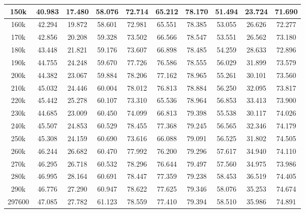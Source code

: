 \documentclass[12pt]{article}
\numberwithin{equation}{section}
\begin{document}
\begin{center}
{\begin{tabular}{|c|c|c|c|c|c|c|c|c|c|}
150k   & 40.983 & 17.480 & 58.076 & 72.714 & 65.212 & 78.170 & 51.494 & 23.724 & 71.690 \\ \hline
160k   & 42.294 & 19.872 & 58.601 & 72.981 & 65.551 & 78.385 & 53.055 & 26.626 & 72.277 \\ \hline
170k   & 42.856 & 20.208 & 59.328 & 73.502 & 66.566 & 78.547 & 53.551 & 26.562 & 73.180 \\ \hline
180k   & 43.448 & 21.821 & 59.176 & 73.607 & 66.898 & 78.485 & 54.259 & 28.633 & 72.896 \\ \hline
190k   & 44.755 & 24.248 & 59.670 & 77.726 & 76.586 & 78.555 & 56.029 & 31.899 & 73.579 \\ \hline
200k   & 44.382 & 23.067 & 59.884 & 78.206 & 77.162 & 78.965 & 55.261 & 30.101 & 73.560 \\ \hline
210k   & 45.032 & 24.446 & 60.004 & 78.012 & 76.813 & 78.884 & 56.250 & 32.095 & 73.817 \\ \hline
220k   & 45.442 & 25.278 & 60.107 & 73.310 & 65.536 & 78.964 & 56.853 & 33.413 & 73.900 \\ \hline
230k   & 44.685 & 23.009 & 60.450 & 74.099 & 66.813 & 79.398 & 55.538 & 30.117 & 74.026 \\ \hline
240k   & 45.507 & 24.853 & 60.529 & 78.455 & 77.368 & 79.245 & 56.565 & 32.346 & 74.179 \\ \hline
250k   & 45.308 & 24.159 & 60.690 & 73.616 & 66.088 & 79.091 & 56.525 & 31.802 & 74.505 \\ \hline
260k   & 46.244 & 26.682 & 60.470 & 77.992 & 76.200 & 79.296 & 57.617 & 34.940 & 74.110 \\ \hline
270k   & 46.295 & 26.718 & 60.532 & 78.296 & 76.644 & 79.497 & 57.560 & 34.975 & 73.986 \\ \hline
280k   & 46.995 & 28.164 & 60.691 & 78.447 & 77.359 & 79.238 & 58.453 & 36.519 & 74.405 \\ \hline
290k   & 46.776 & 27.290 & 60.947 & 78.622 & 77.625 & 79.346 & 58.076 & 35.253 & 74.674 \\ \hline
297600 & 47.085 & 27.782 & 61.123 & 78.559 & 77.410 & 79.394 & 58.510 & 35.986 & 74.891 \\ \hline
\end{tabular}}
\label{tab:temp2000010}
\vspace*{\fill}
\end{center}
\end{document}
